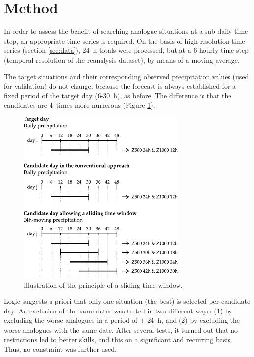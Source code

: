 \documentclass[hess]{copernicus}
\begin{document}



\section{Method}
\label{sec:method}

In order to assess the benefit of searching analogue situations at a sub-daily time step, an appropriate time series is required. On the basis of high resolution time series (section \ref{sec:data}), 24~h totals were processed, but at a 6-hourly time step (temporal resolution of the reanalysis dataset), by means of a moving average. 

The target situations and their corresponding observed precipitation values (used for validation) do not change, because the forecast is always established for a fixed period of the target day (6-30~h), as before. The difference is that the candidates are 4~times more numerous (Figure \ref{fig:principle}).

\begin{figure}[htb]
	\begin{center}
		\includegraphics[width=8.3cm]{figures/illustration_moving_window.pdf}
	\end{center}
	\caption{Illustration of the principle of a sliding time window. }
	\label{fig:principle}
\end{figure}

Logic suggests a priori that only one situation (the best) is selected per candidate day. An exclusion of the same dates was tested in two different ways: (1)
by excluding the worse analogues in a period of $\pm$ 24~h, and (2) by excluding the worse analogues with the same date. After several tests, it turned out that no restrictions led to better skills, and this on a significant and recurring basis. Thus, no constraint was further used.
\end{document}
